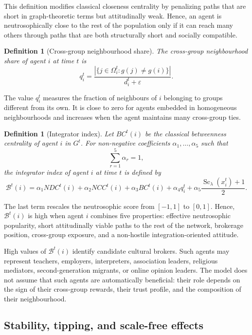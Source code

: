 \documentclass[11pt,a4paper]{article}
\newtheorem{definition}[theorem]{Definition}
\begin{document}
This definition modifies classical closeness centrality by penalizing paths that
are short in graph-theoretic terms but attitudinally weak. Hence, an agent is
neutrosophically close to the rest of the population only if it can reach many
others through paths that are both structurally short and socially compatible.

\begin{definition}[Cross-group neighbourhood share]
	The \emph{cross-group neighbourhood share} of agent $i$ at time $t$ is
	\[
	q_i^t
	=
	\frac{
		\left|\{j\in\Omega_i^t:g(j)\neq g(i)\}\right|
	}{
		d_i^t+\varepsilon
	}.
	\]
\end{definition}

The value $q_i^t$ measures the fraction of neighbours of $i$ belonging to groups
different from its own. It is close to zero for agents embedded in homogeneous
neighbourhoods and increases when the agent maintains many cross-group ties.

\begin{definition}[Integrator index]
	Let $BC^t(i)$ be the classical betweenness centrality of agent $i$ in $G^t$.
	For non-negative coefficients $\alpha_1,\ldots,\alpha_5$ such that
	\[
	\sum_{r=1}^{5}\alpha_r=1,
	\]
	the \emph{integrator index} of agent $i$ at time $t$ is defined by
	\[
	\mathcal B^t(i)
	=
	\alpha_1 NDC^t(i)
	+
	\alpha_2 NCC^t(i)
	+
	\alpha_3 BC^t(i)
	+
	\alpha_4 q_i^t
	+
	\alpha_5
	\frac{\operatorname{Sc}_{\lambda}(x_i^t)+1}{2}.
	\]
\end{definition}

The last term rescales the neutrosophic score from $[-1,1]$ to $[0,1]$. Hence,
$\mathcal B^t(i)$ is high when agent $i$ combines five properties: effective
neutrosophic popularity, short attitudinally viable paths to the rest of the
network, brokerage position, cross-group exposure, and a non-hostile
integration-oriented attitude.

High values of $\mathcal B^t(i)$ identify candidate cultural brokers. Such
agents may represent teachers, employers, interpreters, association leaders,
religious mediators, second-generation migrants, or online opinion leaders. The
model does not assume that such agents are automatically beneficial: their role
depends on the sign of their cross-group rewards, their trust profile, and the
composition of their neighbourhood.

\subsection{Stability, tipping, and scale-free effects}
\end{document}
